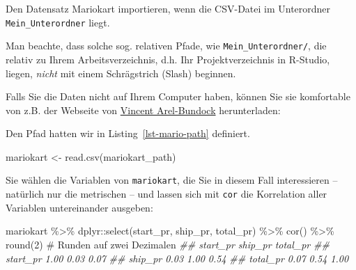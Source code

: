 \documentclass[
  letterpaper,
]{scrbook}
\newenvironment{Shaded}{\begin{snugshade}}{\end{snugshade}}
\newcommand{\CommentTok}[1]{\textcolor[rgb]{0.37,0.37,0.37}{#1}}
\newcommand{\DecValTok}[1]{\textcolor[rgb]{0.68,0.00,0.00}{#1}}
\newcommand{\DocumentationTok}[1]{\textcolor[rgb]{0.37,0.37,0.37}{\textit{#1}}}
\newcommand{\FunctionTok}[1]{\textcolor[rgb]{0.28,0.35,0.67}{#1}}
\newcommand{\NormalTok}[1]{\textcolor[rgb]{0.00,0.23,0.31}{#1}}
\newcommand{\OtherTok}[1]{\textcolor[rgb]{0.00,0.23,0.31}{#1}}
\newcommand{\SpecialCharTok}[1]{\textcolor[rgb]{0.37,0.37,0.37}{#1}}
\newcommand{\StringTok}[1]{\textcolor[rgb]{0.13,0.47,0.30}{#1}}
\theoremstyle{definition}
\theoremstyle{definition}
\theoremstyle{definition}
\theoremstyle{remark}
\begin{document}
\begin{codelisting}

\caption{\label{lst-mario-unterordner}Den Datensatz Mariokart
importieren, wenn die CSV-Datei im Unterordner
\texttt{Mein\_Unterordner} liegt.}

\centering{

\begin{Shaded}
\begin{Highlighting}[]
\NormalTok{mariokart }\OtherTok{\textless{}{-}} \FunctionTok{read.csv}\NormalTok{(}\StringTok{"Mein\_Unterordner/mariokart.csv"}\NormalTok{)}
\end{Highlighting}
\end{Shaded}

}

\end{codelisting}%

Man beachte, dass solche sog. relativen Pfade, wie
\texttt{Mein\_Unterordner/}, die relativ zu Ihrem Arbeitsverzeichnis,
d.h. Ihr Projektverzeichnis in R-Studio, liegen, \emph{nicht} mit einem
Schrägstrich (Slash) beginnen.

Falls Sie die Daten nicht auf Ihrem Computer haben, können Sie sie
komfortable von z.B. der Webseite von
\href{https://vincentarelbundock.github.io/Rdatasets}{Vincent
Arel-Bundock} herunterladen:

Den Pfad hatten wir in Listing~\ref{lst-mario-path} definiert.

\begin{Shaded}
\begin{Highlighting}[]
\NormalTok{mariokart }\OtherTok{\textless{}{-}} \FunctionTok{read.csv}\NormalTok{(mariokart\_path)}
\end{Highlighting}
\end{Shaded}

Sie wählen die Variablen von \texttt{mariokart}, die Sie in diesem Fall
interessieren -- natürlich nur die metrischen -- und lassen sich mit
\texttt{cor} die Korrelation aller Variablen untereinander ausgeben:

\begin{Shaded}
\begin{Highlighting}[]
\NormalTok{mariokart }\SpecialCharTok{\%\textgreater{}\%}  
\NormalTok{  dplyr}\SpecialCharTok{::}\FunctionTok{select}\NormalTok{(start\_pr, ship\_pr, total\_pr) }\SpecialCharTok{\%\textgreater{}\%} 
  \FunctionTok{cor}\NormalTok{() }\SpecialCharTok{\%\textgreater{}\%} 
  \FunctionTok{round}\NormalTok{(}\DecValTok{2}\NormalTok{) }\CommentTok{\# Runden auf zwei Dezimalen}
\DocumentationTok{\#\#          start\_pr ship\_pr total\_pr}
\DocumentationTok{\#\# start\_pr     1.00    0.03     0.07}
\DocumentationTok{\#\# ship\_pr      0.03    1.00     0.54}
\DocumentationTok{\#\# total\_pr     0.07    0.54     1.00}
\end{Highlighting}
\end{Shaded}
\end{document}
